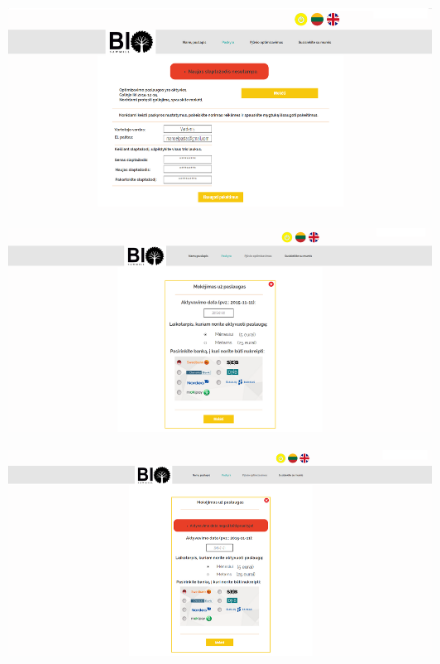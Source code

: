 \documentclass[a4paper,12pt]{article}
\begin{document}
\begin{figure}[!tph]
\hspace{-3cm}
\centering
\includegraphics[scale=0.5]{interfeisai/paskyrosPuslapisVartotojasApmoketas}
\label{fig:verticalcell}
\end{figure}

\begin{figure}[!tph]
\hspace{-3cm}
\centering
\includegraphics[scale=0.5]{interfeisai/paskyrosPuslapisVartotojasMokejimas}
\label{fig:verticalcell}
\end{figure}

\begin{figure}[!tph]
\hspace{-3cm}
\centering
\includegraphics[scale=0.5]{interfeisai/paskyrosPuslapisVartotojasMokejimasSuKlaida}
\label{fig:verticalcell}
\end{figure}
\end{document}
